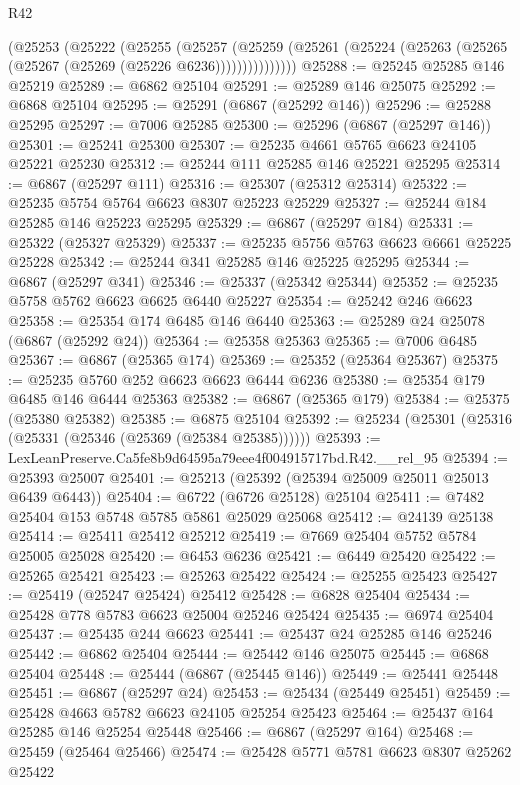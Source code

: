 \begin{lexlean}{R42}
\begin{coremodule}
{          (@25253
            (@25222
              (@25255
                (@25257
                  (@25259
                    (@25261 (@25224 (@25263 (@25265 (@25267 (@25269 (@25226 @6236)))))))))))))))
@25288 := @25245 @25285 @146 @25219
@25289 := @6862 @25104
@25291 := @25289 @146 @25075
@25292 := @6868 @25104
@25295 := @25291 (@6867 (@25292 @146))
@25296 := @25288 @25295
@25297 := @7006 @25285
@25300 := @25296 (@6867 (@25297 @146))
@25301 := @25241 @25300
@25307 := @25235 @4661 @5765 @6623 @24105 @25221 @25230
@25312 := @25244 @111 @25285 @146 @25221 @25295
@25314 := @6867 (@25297 @111)
@25316 := @25307 (@25312 @25314)
@25322 := @25235 @5754 @5764 @6623 @8307 @25223 @25229
@25327 := @25244 @184 @25285 @146 @25223 @25295
@25329 := @6867 (@25297 @184)
@25331 := @25322 (@25327 @25329)
@25337 := @25235 @5756 @5763 @6623 @6661 @25225 @25228
@25342 := @25244 @341 @25285 @146 @25225 @25295
@25344 := @6867 (@25297 @341)
@25346 := @25337 (@25342 @25344)
@25352 := @25235 @5758 @5762 @6623 @6625 @6440 @25227
@25354 := @25242 @246 @6623
@25358 := @25354 @174 @6485 @146 @6440
@25363 := @25289 @24 @25078 (@6867 (@25292 @24))
@25364 := @25358 @25363
@25365 := @7006 @6485
@25367 := @6867 (@25365 @174)
@25369 := @25352 (@25364 @25367)
@25375 := @25235 @5760 @252 @6623 @6623 @6444 @6236
@25380 := @25354 @179 @6485 @146 @6444 @25363
@25382 := @6867 (@25365 @179)
@25384 := @25375 (@25380 @25382)
@25385 := @6875 @25104
@25392 := @25234 (@25301 (@25316 (@25331 (@25346 (@25369 (@25384 @25385))))))
@25393 := LexLeanPreserve.Ca5fe8b9d64595a79eee4f004915717bd.R42.__rel_95
@25394 := @25393 @25007
@25401 := @25213 (@25392 (@25394 @25009 @25011 @25013 @6439 @6443))
@25404 := @6722 (@6726 @25128) @25104
@25411 := @7482 @25404 @153 @5748 @5785 @5861 @25029 @25068
@25412 := @24139 @25138
@25414 := @25411 @25412 @25212
@25419 := @7669 @25404 @5752 @5784 @25005 @25028
@25420 := @6453 @6236
@25421 := @6449 @25420
@25422 := @25265 @25421
@25423 := @25263 @25422
@25424 := @25255 @25423
@25427 := @25419 (@25247 @25424) @25412
@25428 := @6828 @25404
@25434 := @25428 @778 @5783 @6623 @25004 @25246 @25424
@25435 := @6974 @25404
@25437 := @25435 @244 @6623
@25441 := @25437 @24 @25285 @146 @25246
@25442 := @6862 @25404
@25444 := @25442 @146 @25075
@25445 := @6868 @25404
@25448 := @25444 (@6867 (@25445 @146))
@25449 := @25441 @25448
@25451 := @6867 (@25297 @24)
@25453 := @25434 (@25449 @25451)
@25459 := @25428 @4663 @5782 @6623 @24105 @25254 @25423
@25464 := @25437 @164 @25285 @146 @25254 @25448
@25466 := @6867 (@25297 @164)
@25468 := @25459 (@25464 @25466)
@25474 := @25428 @5771 @5781 @6623 @8307 @25262 @25422
}
\end{coremodule}
\end{lexlean}
